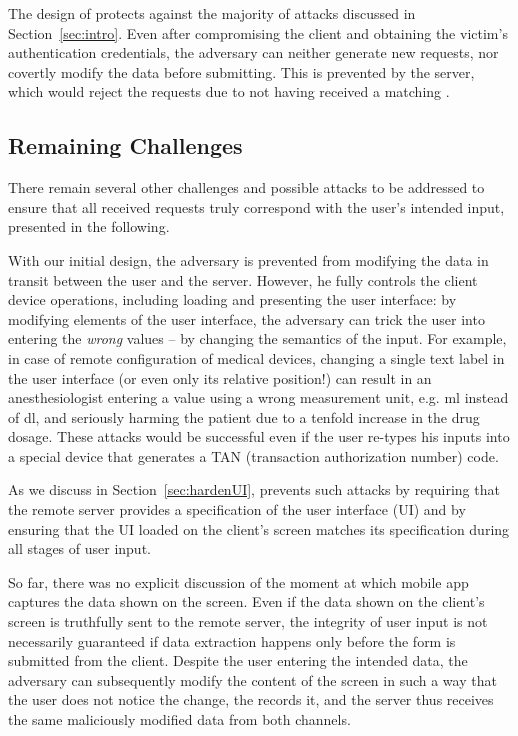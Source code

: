 The design of \sysname protects against the majority of attacks discussed in Section~\ref{sec:intro}.
Even after compromising the client and obtaining the victim's authentication credentials, the adversary can neither generate new requests, nor covertly modify the data before submitting.
This is prevented by the server, which would reject the requests due to not having received a matching \POI.


\subsection{Remaining Challenges}
\label{sec:systemDesign:challenger}

There remain several other challenges and possible attacks to be addressed to ensure that all received requests truly correspond with the user's intended input, presented in the following.

With our initial design, the adversary is prevented from modifying the data in transit between the user and the server.
However, he fully controls the client device operations, including loading and presenting the user interface: by modifying elements of the user interface, the adversary can trick the user into entering the \textit{wrong} values -- by changing the semantics of the input.
For example, in case of remote configuration of medical devices, changing a single text label in the user interface (or even only its relative position!) can result in an anesthesiologist entering a value using a wrong measurement unit, e.g. ml instead of dl, and seriously harming the patient due to a tenfold increase in the drug dosage.
These attacks would be successful even if the user re-types his inputs into a special device that generates a TAN (transaction authorization number) code.

As we discuss in Section~\ref{sec:hardenUI}, \sysname prevents such attacks by requiring that the remote server provides a specification of the user interface (UI) and by ensuring that the UI loaded on the client's screen matches its specification during all stages of user input.


So far, there was no explicit discussion of the moment at which mobile app captures the data shown on the screen.
Even if the data shown on the client's screen is truthfully sent to the remote server, the integrity of user input is not necessarily guaranteed if data extraction happens only before the form is submitted from the client.
Despite the user entering the intended data, the adversary can subsequently modify the content of the screen in such a way that the user does not notice the change, the \app records it, and the server thus receives the same maliciously modified data from both channels.

